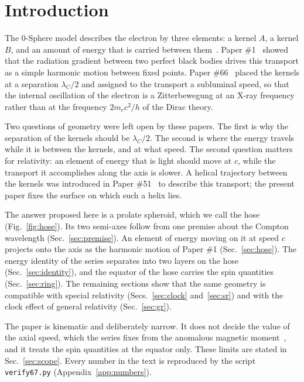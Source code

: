 \documentclass[%
 reprint, amsmath,amssymb, aps, prb, ]{revtex4-2}
\numberwithin{equation}{section}
\newcommand{\lamC}{\lambda_C}
\begin{document}
\maketitle

\section{Introduction}

The 0-Sphere model describes the electron by three elements: a kernel $A$, a kernel $B$, and an amount of energy that is carried between them~\cite{H01,H66}. Paper \#1~\cite{H01} showed that the radiation gradient between two perfect black bodies drives this transport as a simple harmonic motion between fixed points. Paper \#66~\cite{H66} placed the kernels at a separation $\lamC/2$ and assigned to the transport a subluminal speed, so that the internal oscillation of the electron is a Zitterbewegung at an X-ray frequency rather than at the frequency $2m_ec^2/h$ of the Dirac theory.

Two questions of geometry were left open by these papers. The first is why the separation of the kernels should be $\lamC/2$. The second is where the energy travels while it is between the kernels, and at what speed. The second question matters for relativity: an element of energy that is light should move at $c$, while the transport it accomplishes along the axis is slower. A helical trajectory between the kernels was introduced in Paper \#51~\cite{H51} to describe this transport; the present paper fixes the surface on which such a helix lies.

The answer proposed here is a prolate spheroid, which we call the hose (Fig.~\ref{fig:hose}). Its two semi-axes follow from one premise about the Compton wavelength (Sec.~\ref{sec:premise}). An element of energy moving on it at speed $c$ projects onto the axis as the harmonic motion of Paper \#1 (Sec.~\ref{sec:hose}). The energy identity of the series separates into two layers on the hose (Sec.~\ref{sec:identity}), and the equator of the hose carries the spin quantities (Sec.~\ref{sec:ring}). The remaining sections show that the same geometry is compatible with special relativity (Secs.~\ref{sec:clock} and~\ref{sec:sr}) and with the clock effect of general relativity (Sec.~\ref{sec:gr}).

The paper is kinematic and deliberately narrow. It does not decide the value of the axial speed, which the series fixes from the anomalous magnetic moment~\cite{H10,H66}, and it treats the spin quantities at the equator only. These limits are stated in Sec.~\ref{sec:scope}. Every number in the text is reproduced by the script \texttt{verify67.py} (Appendix~\ref{app:numbers}).
\end{document}
